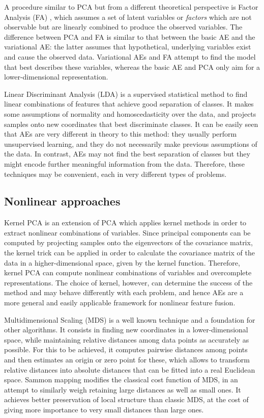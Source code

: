 A procedure similar to PCA but from a different theoretical perspective is Factor Analysis (FA) \cite{PCAandFA}, which assumes a set of latent variables or \textit{factors} which are not observable but are linearly combined to produce the observed variables. The difference between PCA and FA is similar to that between the basic AE and the variational AE: the latter assumes that hypothetical, underlying variables exist and cause the observed data. Variational AEs and FA attempt to find the model that best describes these variables, whereas the basic AE and PCA only aim for a lower-dimensional representation.

Linear Discriminant Analysis (LDA) \cite{FisherLDA} is a supervised statistical method to find linear combinations of features that achieve good separation of classes. It makes some assumptions of normality and homoscedasticity over the data, and projects samples onto new coordinates that best discriminate classes. It can be easily seen that AEs are very different in theory to this method: they usually perform unsupervised learning, and they do not necessarily make previous assumptions of the data. In contrast, AEs may not find the best separation of classes but they might encode further meaningful information from the data. Therefore, these techniques may be convenient, each in very different types of problems.

\subsection{Nonlinear approaches}

Kernel PCA \cite{KernelPCA} is an extension of PCA which applies kernel methods in order to extract nonlinear combinations of variables. Since principal components can be computed by projecting samples onto the eigenvectors of the covariance matrix, the kernel trick can be applied in order to calculate the covariance matrix of the data in a higher-dimensional space, given by the kernel function. Therefore, kernel PCA can compute nonlinear combinations of variables and overcomplete representations. The choice of kernel, however, can determine the success of the method and may behave differently with each problem, and hence AEs are a more general and easily applicable framework for nonlinear feature fusion.

Multidimensional Scaling (MDS) \cite{MDS} is a well known technique and a foundation for other algorithms. It consists in finding new coordinates in a lower-dimensional space, while maintaining relative distances among data points as accurately as possible. For this to be achieved, it computes pairwise distances among points and then estimates an origin or zero point for these, which allows to transform relative distances into absolute distances that can be fitted into a real Euclidean space. Sammon mapping \cite{Sammon} modifies the classical cost function of MDS, in an attempt to similarly weigh retaining large distances as well as small ones. It achieves better preservation of local structure than classic MDS, at the cost of giving more importance to very small distances than large ones.  

